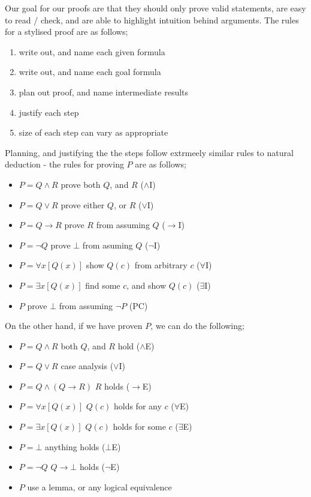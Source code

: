 \documentclass[a4paper, 12pt]{article}
\begin{document}
                Our goal for our proofs are that they should only prove valid statements, are easy to read / check, and are able to highlight intuition behind arguments. The rules for a stylised proof are as follows;
                \begin{enumerate}[1.]
                    \itemsep0em
                    \item write out, and name each given formula
                    \item write out, and name each goal formula
                    \item plan out proof, and name intermediate results
                    \item justify each step
                    \item size of each step can vary as appropriate
                \end{enumerate}
                Planning, and justifying the the steps follow extrmeely similar rules to natural deduction - the rules for proving $P$ are as follows;
                \begin{itemize}
                    \itemsep0em
                    \item $P = Q \land R$ \hfill prove both $Q$, and $R$ ($\land$I)
                    \item $P = Q \lor R$ \hfill prove either $Q$, or $R$ ($\lor$I)
                    \item $P = Q \rightarrow R$ \hfill prove $R$ from assuming $Q$ ($\rightarrow$I)
                    \item $P = \neg Q$ \hfill prove $\bot$ from asuming $Q$ ($\neg$I)
                    \item $P = \forall x [Q(x)]$ \hfill show $Q(c)$ from arbitrary $c$ ($\forall$I)
                    \item $P = \exists x [Q(x)]$ \hfill find some $c$, and show $Q(c)$ ($\exists$I)
                    \item $P$ \hfill prove $\bot$ from assuming $\neg P$ (PC)
                \end{itemize}
                On the other hand, if we have proven $P$, we can do the following;
                \begin{itemize}
                    \itemsep0em
                    \item $P = Q \land R$ \hfill both $Q$, and $R$ hold ($\land$E)
                    \item $P = Q \lor R$ \hfill case analysis ($\lor$I)
                    \item $P = Q \land (Q \rightarrow R)$ \hfill $R$ holds ($\rightarrow$E)
                    \item $P = \forall x [Q(x)]$ \hfill $Q(c)$ holds for any $c$ ($\forall$E)
                    \item $P = \exists x [Q(x)]$ \hfill $Q(c)$ holds for some $c$ ($\exists$E)
                    \item $P = \bot$ \hfill anything holds ($\bot$E)
                    \item $P = \neg Q$ \hfill $Q \rightarrow \bot$ holds ($\neg$E)
                    \item $P$ \hfill use a lemma, or any logical equivalence
                \end{itemize}
\end{document}

